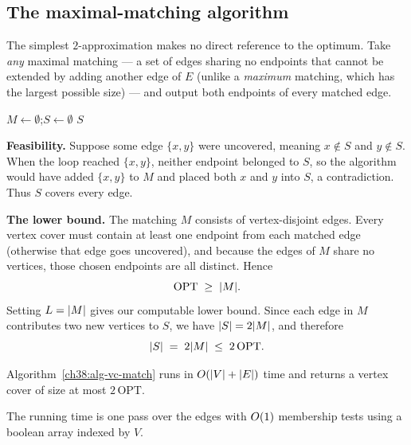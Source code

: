 \subsection{The maximal-matching algorithm}

The simplest $2$-approximation makes no direct reference to the optimum. Take \emph{any} maximal
matching --- a set of edges sharing no endpoints that cannot be extended by adding another edge of $E$
(unlike a \emph{maximum} matching, which has the largest possible size) --- and output both endpoints
of every matched edge.

\begin{algorithm}[H]
\caption{\textsc{VertexCover-Matching}$(\Gph=(V,E))$}\label{ch38:alg-vc-match}
\DontPrintSemicolon
$M \gets \emptyset$;\quad $S \gets \emptyset$\;
\Return $S$\;
\end{algorithm}

\begin{whybox}
\textbf{Feasibility.} Suppose some edge $\{x,y\}$ were uncovered, meaning $x\notin S$ and $y\notin S$.
When the loop reached $\{x,y\}$, neither endpoint belonged to $S$, so the algorithm would have added
$\{x,y\}$ to $M$ and placed both $x$ and $y$ into $S$, a contradiction. Thus $S$ covers every edge.

\textbf{The lower bound.} The matching $M$ consists of vertex-disjoint edges. Every vertex cover must
contain at least one endpoint from each matched edge (otherwise that edge goes uncovered), and because
the edges of $M$ share no vertices, those chosen endpoints are all distinct. Hence
\[
  \mathrm{OPT} \;\ge\; \lvert M\rvert.
\]
Setting $L=\lvert M\rvert$ gives our computable lower bound. Since each edge in $M$ contributes two new
vertices to $S$, we have $\lvert S\rvert=2\lvert M\rvert$, and therefore
\[
  \lvert S\rvert \;=\; 2\lvert M\rvert \;\le\; 2\,\mathrm{OPT}.
\]
\end{whybox}

\begin{theorem}\label{ch38:thm-vc2}
Algorithm~\ref{ch38:alg-vc-match} runs in $O(\lvert V\rvert+\lvert E\rvert)$ time and returns a vertex cover of size
at most $2\,\mathrm{OPT}$.
\end{theorem}

The running time is one pass over the edges with $O(1)$ membership tests using a boolean array indexed by $V$.

